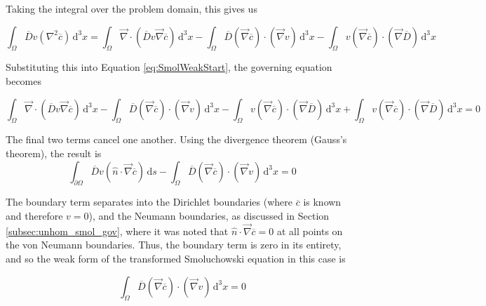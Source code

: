 Taking the integral over the problem domain, this gives us

\begin{equation}
  \int_{\Omega} \overline{D} v \left(\nabla^2 \overline{c} \right) \,\mathrm{d}^3x=
  \int_{\Omega} \vec{\nabla} \cdot \left( \overline{D} v \vec{\nabla} \overline{c} \right) \,\mathrm{d}^3x
  - \int_{\Omega} \overline{D} \left(\vec{\nabla}\overline{c}\right) \cdot \left(\vec{\nabla}v\right)\,\mathrm{d}^3x
  - \int_{\Omega} v \left(\vec{\nabla}\overline{c}\right) \cdot \left(\vec{\nabla}\overline{D}\right) \,\mathrm{d}^3x
\end{equation}

Substituting this into Equation \ref{eq:SmolWeakStart},
the governing equation becomes

\begin{equation}
  \int_{\Omega} \vec{\nabla} \cdot \left( \overline{D} v \vec{\nabla} \overline{c} \right) \,\mathrm{d}^3x
  - \int_{\Omega} \overline{D} \left(\vec{\nabla}\overline{c}\right) \cdot \left(\vec{\nabla}v\right)\,\mathrm{d}^3x
  - \int_{\Omega} v \left(\vec{\nabla}\overline{c}\right) \cdot \left(\vec{\nabla}\overline{D}\right) \,\mathrm{d}^3x
  + \int_{\Omega} v \left( \vec{\nabla} \overline{c} \right) \cdot \left( \vec{\nabla} \overline{D} \right) \,\mathrm{d}^3x = 0
\end{equation}

The final two terms cancel one another.
Using the divergence theorem (Gauss's theorem), the result is
\begin{equation}
  \int_{\partial\Omega} \overline{D} v \left(\hat{n} \cdot \vec{\nabla}\overline{c}\right) \,\mathrm{d}s
  - \int_{\Omega} \overline{D} \left(\vec{\nabla}\overline{c}\right) \cdot \left(\vec{\nabla}v\right)\,\mathrm{d}^3x
  = 0
\end{equation}

The boundary term separates into the Dirichlet boundaries (where $\overline{c}$ is known and therefore $v=0$),
and the Neumann boundaries, as discussed in Section \ref{subsec:unhom_smol_gov},
where it was noted that $\hat{n} \cdot \vec{\nabla} \overline{c} = 0$ at all points on the von Neumann boundaries.
Thus, the boundary term is zero in its entirety,
and so the weak form of the transformed Smoluchowski equation in this case is

\begin{equation}
  \int_{\Omega} \overline{D} \left(\vec{\nabla}\overline{c}\right) \cdot \left(\vec{\nabla}v\right)\,\mathrm{d}^3x = 0
\end{equation}

